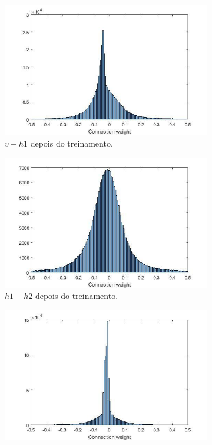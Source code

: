 \documentclass{article}
\begin{document}
\begin{figure}[h!]
\begin{subfigure}{0.5\textwidth}
                    \includegraphics[scale=0.3]{Images/Weights distribution (3).png}
                    \caption{$v - h1$ depois do treinamento.}
                \end{subfigure}
                \begin{subfigure}{0.5\textwidth}
                    \centering
                    \includegraphics[scale=0.3]{Images/Weights distribution (4).png}
                    \caption{$h1 - h2$ depois do treinamento.}
                \end{subfigure}
                \begin{center}
                    \begin{subfigure}{0.5\textwidth}
                        \centering
                        \includegraphics[scale=0.3]{Images/Weights distribution (5).png}

\end{subfigure}
\end{center}
\end{figure}
\end{document}
